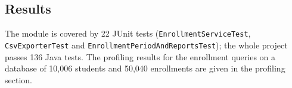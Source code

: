 \subsection{Results}
The module is covered by 22 JUnit tests (\texttt{EnrollmentServiceTest}, \texttt{CsvExporterTest} and
\texttt{EnrollmentPeriodAndReportsTest}); the whole project passes 136 Java tests. The profiling results for
the enrollment queries on a database of 10{,}006 students and 50{,}040 enrollments are given in the
profiling section.
